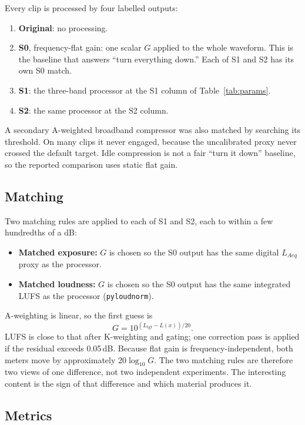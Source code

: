 \documentclass[12pt,journal,onecolumn]{IEEEtran}
\begin{document}
Every clip is processed by four labelled outputs:

\begin{enumerate}
\item \textbf{Original}: no processing.
\item \textbf{S0}, frequency-flat gain: one scalar $G$ applied to the whole waveform. This is the baseline that answers ``turn everything down.'' Each of S1 and S2 has its own S0 match.
\item \textbf{S1}: the three-band processor at the S1 column of Table~\ref{tab:params}.
\item \textbf{S2}: the same processor at the S2 column.
\end{enumerate}

A secondary A-weighted broadband compressor was also matched by searching its threshold. On many clips it never engaged, because the uncalibrated proxy never crossed the default target. Idle compression is not a fair ``turn it down'' baseline, so the reported comparison uses static flat gain.

\subsection{Matching}

Two matching rules are applied to each of S1 and S2, each to within a few hundredths of a dB:

\begin{itemize}
\item \textbf{Matched exposure:} $G$ is chosen so the S0 output has the same digital $L_{Aeq}$ proxy as the processor.
\item \textbf{Matched loudness:} $G$ is chosen so the S0 output has the same integrated LUFS \cite{BS1770} as the processor (\texttt{pyloudnorm}).
\end{itemize}

A-weighting is linear, so the first guess is
\begin{equation}
G = 10^{(L_{\mathrm{tgt}}-L(x))/20}.
\end{equation}
LUFS is close to that after K-weighting and gating; one correction pass is applied if the residual exceeds 0.05\,dB. Because flat gain is frequency-independent, both meters move by approximately $20\log_{10} G$. The two matching rules are therefore two views of one difference, not two independent experiments. The interesting content is the sign of that difference and which material produces it.

\subsection{Metrics}
\end{document}
